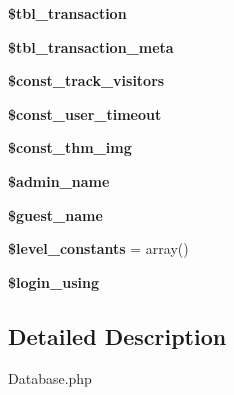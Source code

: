 \begin{DoxyCompactItemize}
\item 
\hypertarget{class_my_s_q_l_d_b_a40ee7448d804a22c531c60958e319a38}{{\bfseries \$tbl\-\_\-transaction}}\label{class_my_s_q_l_d_b_a40ee7448d804a22c531c60958e319a38}

\item 
\hypertarget{class_my_s_q_l_d_b_a117a0f5cc84e9751d8127ef8424adfdc}{{\bfseries \$tbl\-\_\-transaction\-\_\-meta}}\label{class_my_s_q_l_d_b_a117a0f5cc84e9751d8127ef8424adfdc}

\item 
\hypertarget{class_my_s_q_l_d_b_a5facc7ca3e4ec922df05a36b37090e7a}{{\bfseries \$const\-\_\-track\-\_\-visitors}}\label{class_my_s_q_l_d_b_a5facc7ca3e4ec922df05a36b37090e7a}

\item 
\hypertarget{class_my_s_q_l_d_b_a6dfd471cf4aead011e94550eb5fb5928}{{\bfseries \$const\-\_\-user\-\_\-timeout}}\label{class_my_s_q_l_d_b_a6dfd471cf4aead011e94550eb5fb5928}

\item 
\hypertarget{class_my_s_q_l_d_b_a7c48411adbf9c043cefc5117c8cdb24f}{{\bfseries \$const\-\_\-thm\-\_\-img}}\label{class_my_s_q_l_d_b_a7c48411adbf9c043cefc5117c8cdb24f}

\item 
\hypertarget{class_my_s_q_l_d_b_a75adbb04f5fc07855188c31c9bd3f3d1}{{\bfseries \$admin\-\_\-name}}\label{class_my_s_q_l_d_b_a75adbb04f5fc07855188c31c9bd3f3d1}

\item 
\hypertarget{class_my_s_q_l_d_b_a154b4cc1077ceb10ba48899c4c5ac8d0}{{\bfseries \$guest\-\_\-name}}\label{class_my_s_q_l_d_b_a154b4cc1077ceb10ba48899c4c5ac8d0}

\item 
\hypertarget{class_my_s_q_l_d_b_a4dea27868cf3c6bf27808026473b4891}{{\bfseries \$level\-\_\-constants} = array()}\label{class_my_s_q_l_d_b_a4dea27868cf3c6bf27808026473b4891}

\item 
\hypertarget{class_my_s_q_l_d_b_a83611445b6214c8c84135e8bd288f118}{{\bfseries \$login\-\_\-using}}\label{class_my_s_q_l_d_b_a83611445b6214c8c84135e8bd288f118}

\end{DoxyCompactItemize}


\subsection{Detailed Description}
Database.\-php


